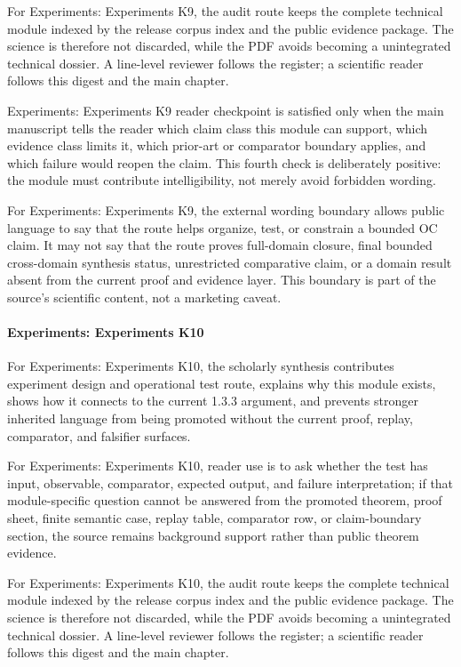 For Experiments: Experiments K9, the audit route keeps the complete technical module indexed by the release corpus index and the public evidence package. The science is therefore not discarded, while the PDF avoids becoming a unintegrated technical dossier. A line-level reviewer follows the register; a scientific reader follows this digest and the main chapter.


Experiments: Experiments K9 reader checkpoint is satisfied only when the main manuscript tells the reader which claim class this module can support, which evidence class limits it, which prior-art or comparator boundary applies, and which failure would reopen the claim. This fourth check is deliberately positive: the module must contribute intelligibility, not merely avoid forbidden wording.


For Experiments: Experiments K9, the external wording boundary allows public language to say that the route helps organize, test, or constrain a bounded OC claim. It may not say that the route proves full-domain closure, final bounded cross-domain synthesis status, unrestricted comparative claim, or a domain result absent from the current proof and evidence layer. This boundary is part of the source's scientific content, not a marketing caveat.


\paragraph{Experiments: Experiments K10}

For Experiments: Experiments K10, the scholarly synthesis contributes experiment design and operational test route, explains why this module exists, shows how it connects to the current 1.3.3 argument, and prevents stronger inherited language from being promoted without the current proof, replay, comparator, and falsifier surfaces.


For Experiments: Experiments K10, reader use is to ask whether the test has input, observable, comparator, expected output, and failure interpretation; if that module-specific question cannot be answered from the promoted theorem, proof sheet, finite semantic case, replay table, comparator row, or claim-boundary section, the source remains background support rather than public theorem evidence.


For Experiments: Experiments K10, the audit route keeps the complete technical module indexed by the release corpus index and the public evidence package. The science is therefore not discarded, while the PDF avoids becoming a unintegrated technical dossier. A line-level reviewer follows the register; a scientific reader follows this digest and the main chapter.


